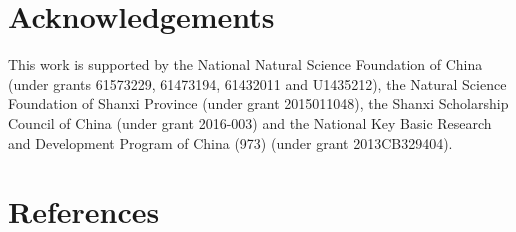 \documentclass[review]{elsarticle}
\begin{document}
\section*{Acknowledgements}
This work is supported by the National Natural Science Foundation of China (under grants 61573229, 61473194, 61432011 and U1435212), the Natural Science Foundation of Shanxi Province (under grant 2015011048), the Shanxi Scholarship Council of China (under grant 2016-003) and the National Key Basic Research and Development Program of China (973) (under grant 2013CB329404).

\section*{References}


\end{document}
